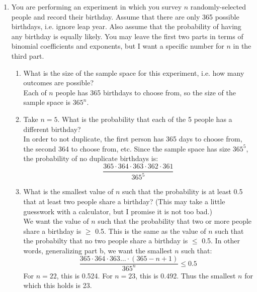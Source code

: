\documentclass[12pt]{article}
\begin{document}
\begin{enumerate}
\item You are performing an experiment in which you survey $n$ randomly-selected people and record their birthday. Assume that there are only 365 possible birthdays, i.e. ignore leap year. Also assume that the probability of having any birthday is equally likely. You may leave the first two parts in terms of binomial coefficients and exponents, but I want a specific number for $n$ in the third part.
\begin{enumerate}
\item What is the size of the sample space for this experiment, i.e. how many outcomes are possible?\\

Each of $n$ people has 365 birthdays to choose from, so the size of the sample space is $365^n$.

\item Take $n = 5$. What is the probability that each of the 5 people has a different birthday?\\

In order to not duplicate, the first person has 365 days to choose from, the second 364 to choose from, etc. Since the sample space has size $365^5$, the probability of no duplicate birthdays is:
\[
\frac{ 365 \cdot 364 \cdot 363 \cdot 362 \cdot 361}{365^5}
\]

\item What is the smallest value of $n$ such that the probability is at least 0.5 that at least two people share a birthday? (This may take a little guesswork with a calculator, but I promise it is not too bad.)\\

We want the value of $n$ such that the probability that two or more people share a birthday is $\geq$ 0.5. This is the same as the value of $n$ such that the probabilty that no two people share a birthday is $\leq$ 0.5. In other words, generalizing part b, we want the smallest $n$ such that:
\[
\frac{ 365 \cdot 364 \cdot 363 \dots \cdot (365 - n + 1)}{365^n} \leq 0.5
\] 
For $n = 22$, this is 0.524. For $n = 23$, this is 0.492. Thus the smallest $n$ for which this holds is 23.

\end{enumerate}


\end{enumerate}
\end{document}
